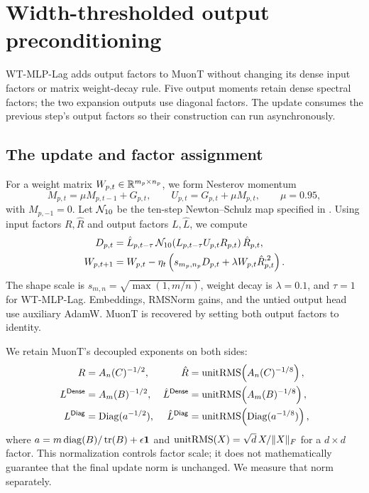 \section{Width-thresholded output preconditioning}
\label{sec:method}

WT-MLP-Lag adds output factors to MuonT without changing its dense input factors or matrix weight-decay rule. Five output moments retain dense spectral factors; the two expansion outputs use diagonal factors. The update consumes the previous step's output factors so their construction can run asynchronously.

\subsection{The update and factor assignment}
\label{sec:operator}

For a weight matrix $W_{p,t}\in\mathbb{R}^{m_p\times n_p}$, we form Nesterov momentum
\begin{equation}
 M_{p,t}=\mu M_{p,t-1}+G_{p,t},\qquad U_{p,t}=G_{p,t}+\mu M_{p,t},\qquad\mu=0.95,
 \label{eq:momentum}
\end{equation}
with $M_{p,-1}=0$. Let $\mathcal{N}_{10}$ be the ten-step Newton--Schulz map specified in . Using input factors $R,\hat R$ and output factors $L,\hat L$, we compute
\begin{align}
 D_{p,t}&=\hat L_{p,t-\tau}\,\mathcal{N}_{10}\!\left(L_{p,t-\tau}U_{p,t}R_{p,t}\right)\hat R_{p,t},\nonumber\\
 W_{p,t+1}&=W_{p,t}-\eta_t\left(s_{m_p,n_p}D_{p,t}+\lambda W_{p,t}\hat R_{p,t}^{,2}\right).
 \label{eq:update}
\end{align}
The shape scale is $s_{m,n}=\sqrt{\max(1,m/n)}$, weight decay is $\lambda=0.1$, and $\tau=1$ for WT-MLP-Lag. Embeddings, RMSNorm gains, and the untied output head use auxiliary AdamW. MuonT is recovered by setting both output factors to identity.

We retain MuonT's decoupled exponents on both sides:
\begin{align}
 R&=A_n(C)^{-1/2},&\hat R&=\operatorname{unitRMS}\!\left(A_n(C)^{-1/8}\right),\nonumber\\
 L^{\mathsf{Dense}}&=A_m(B)^{-1/2},&\hat L^{\mathsf{Dense}}&=\operatorname{unitRMS}\!\left(A_m(B)^{-1/8}\right),
 \label{eq:dense_roots}\\
 L^{\mathsf{Diag}}&=\operatorname{Diag}(a^{-1/2}),&\hat L^{\mathsf{Diag}}&=\operatorname{unitRMS}\!\left(\operatorname{Diag}(a^{-1/8})\right),
 \label{eq:diag_roots}
\end{align}
where $a=m\operatorname{diag}(B)/\operatorname{tr}(B)+\epsilon\mathbf1$ and $\operatorname{unitRMS}(X)=\sqrt d\,X/\|X\|_F$ for a $d\times d$ factor. This normalization controls factor scale; it does not mathematically guarantee that the final update norm is unchanged. We measure that norm separately.

